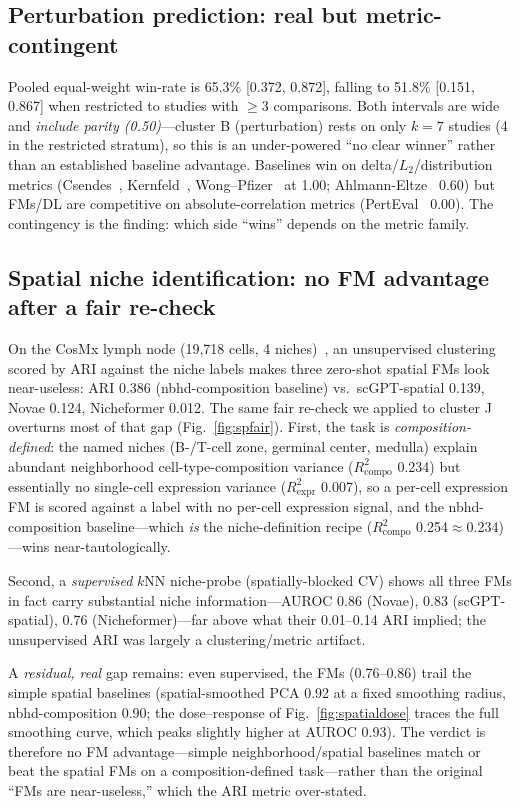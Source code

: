 \documentclass[fleqn,10pt,lineno]{wlpeerj}  %
\begin{document}
\subsection{Perturbation prediction: real but metric-contingent}
Pooled equal-weight win-rate is 65.3\% [0.372, 0.872], falling to 51.8\% [0.151, 0.867] when restricted to studies with $\geq$3 comparisons. Both intervals are wide and \emph{include parity (0.50)}---cluster B (perturbation) rests on only $k{=}7$ studies (4 in the restricted stratum), so this is an under-powered ``no clear winner'' rather than an established baseline advantage. Baselines win on delta/$L_2$/distribution metrics (Csendes~\cite{csendes2025}, Kernfeld~\cite{kernfeld2025}, Wong--Pfizer~\cite{wongpfizer2025} at 1.00; Ahlmann-Eltze~\cite{ahlmann2025} 0.60) but FMs/DL are competitive on absolute-correlation metrics (PertEval~\cite{perteval2024} 0.00). The contingency is the finding: which side ``wins'' depends on the metric family.

\subsection{Spatial niche identification: no FM advantage after a fair re-check}
On the CosMx lymph node (19{,}718 cells, 4 niches)~\cite{wang2026niche}, an unsupervised clustering scored by ARI against the niche labels makes three zero-shot spatial FMs look near-useless: ARI 0.386 (nbhd-composition baseline) vs.\ scGPT-spatial 0.139, Novae 0.124, Nicheformer 0.012. The same fair re-check we applied to cluster J overturns most of that gap (Fig.~\ref{fig:spfair}). First, the task is \emph{composition-defined}: the named niches (B-/T-cell zone, germinal center, medulla) explain abundant neighborhood cell-type-composition variance ($R^2_{\mathrm{compo}}$ 0.234) but essentially no single-cell expression variance ($R^2_{\mathrm{expr}}$ 0.007), so a per-cell expression FM is scored against a label with no per-cell expression signal, and the nbhd-composition baseline---which \emph{is} the niche-definition recipe ($R^2_{\mathrm{compo}}$ 0.254$\approx$0.234)---wins near-tautologically.

Second, a \emph{supervised} $k$NN niche-probe (spatially-blocked CV) shows all three FMs in fact carry substantial niche information---AUROC 0.86 (Novae), 0.83 (scGPT-spatial), 0.76 (Nicheformer)---far above what their 0.01--0.14 ARI implied; the unsupervised ARI was largely a clustering/metric artifact.

A \emph{residual, real} gap remains: even supervised, the FMs (0.76--0.86) trail the simple spatial baselines (spatial-smoothed PCA 0.92 at a fixed smoothing radius, nbhd-composition 0.90; the dose--response of Fig.~\ref{fig:spatialdose} traces the full smoothing curve, which peaks slightly higher at AUROC 0.93). The verdict is therefore no FM advantage---simple neighborhood/spatial baselines match or beat the spatial FMs on a composition-defined task---rather than the original ``FMs are near-useless,'' which the ARI metric over-stated.
\end{document}
